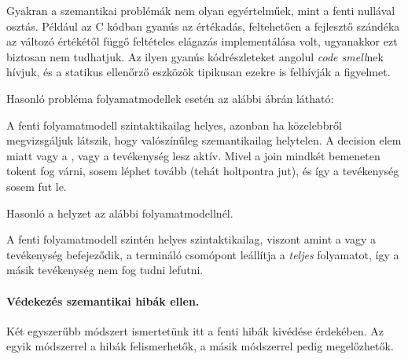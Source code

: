 Gyakran a szemantikai problémák nem olyan egyértelműek, mint a fenti nullával osztás. Például az  C kódban gyanús az értékadás, feltehetően a fejlesztő szándéka az  változó értékétől függő feltételes elágazás implementálása volt, ugyanakkor ezt biztosan nem tudhatjuk. Az ilyen gyanús kódrészleteket angolul \emph{code smell}nek hívjuk, és a statikus ellenőrző eszközök tipikusan ezekre is felhívják a figyelmet.

Hasonló probléma folyamatmodellek esetén az alábbi ábrán látható:


A fenti folyamatmodell szintaktikailag helyes, azonban ha közelebbről megvizsgáljuk látszik, hogy valószínűleg szemantikailag helytelen. A decision elem miatt vagy a , vagy a  tevékenység lesz aktív. Mivel a join mindkét bemeneten tokent fog várni, sosem léphet tovább (tehát holtpontra jut), és így a  tevékenység sosem fut le.

Hasonló a helyzet az alábbi folyamatmodellnél.

A fenti folyamatmodell szintén helyes szintaktikailag, viszont amint a  vagy a  tevékenység befejeződik, a termináló csomópont leállítja a \emph{teljes} folyamatot, így a másik tevékenység nem fog tudni lefutni.

\paragraph{Védekezés szemantikai hibák ellen.}
Két egyszerűbb módszert ismertetünk itt a fenti hibák kivédése érdekében. Az egyik módszerrel a hibák felismerhetők, a másik módszerrel pedig megelőzhetők.

